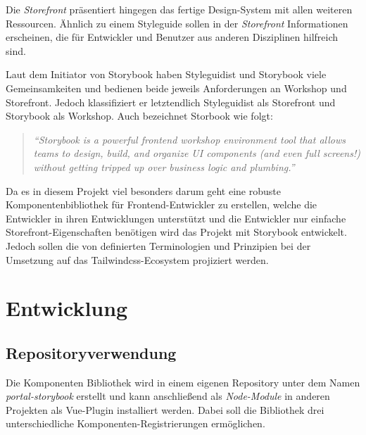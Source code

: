 Die \textit{Storefront} präsentiert hingegen das fertige Design-System mit allen weiteren Ressourcen. Ähnlich zu einem Styleguide sollen in der \textit{Storefront} Informationen erscheinen, die für Entwickler und Benutzer aus anderen Disziplinen hilfreich sind.

Laut \cite{StorybookVSStyleguidist} dem Initiator von Storybook haben Styleguidist und Storybook viele Gemeinsamkeiten und bedienen beide jeweils Anforderungen an Workshop und Storefront. Jedoch klassifiziert er letztendlich Styleguidist als Storefront und Storybook als Workshop. Auch \cite{FrostCite} bezeichnet Storbook wie folgt:
\begin{quotation}
    \emph{``Storybook is a powerful frontend workshop environment tool that allows teams to design, build, and organize UI components (and even full screens!) without getting tripped up over business logic and plumbing.''}
\end{quotation}
Da es in diesem Projekt viel besonders darum geht eine robuste Komponentenbibliothek für Frontend-Entwickler zu erstellen, welche die Entwickler in ihren Entwicklungen unterstützt und die Entwickler nur einfache Storefront-Eigenschaften benötigen wird das Projekt mit Storybook entwickelt. Jedoch sollen die von \citep{VueDesignSystemTerminology} definierten Terminologien und Prinzipien bei der Umsetzung auf das Tailwindcss-Ecosystem projiziert werden.

\section{Entwicklung}
\subsection{Repositoryverwendung}
Die Komponenten Bibliothek wird in einem eigenen Repository unter dem Namen \textit{portal-storybook} erstellt und kann anschließend als \textit{Node-Module} in anderen Projekten als Vue-Plugin installiert werden. Dabei soll die Bibliothek drei unterschiedliche Komponenten-Registrierungen ermöglichen.

